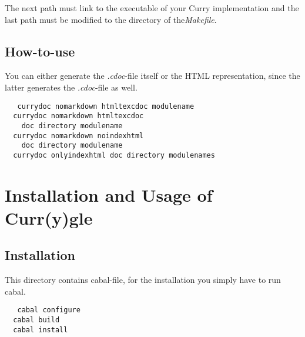 \documentclass[%
	pdftex,%
	a4paper,%
	oneside,%
	chapterprefix,%
	headsepline,%
	12pt%
]{scrbook}
\begin{document}
The next path must link to the executable of your Curry implementation
and the last path must be modified to the directory of
the\emph{Makefile}.

\section{How-to-use}

You can either generate the \emph{.cdoc}-file itself or the HTML
representation, since the latter generates the \emph{.cdoc}-file as well.
 
\begin{tabbing}\tt
~~currydoc~nomarkdown~htmltexcdoc~modulename\\
\tt ~~currydoc~nomarkdown~htmltexcdoc~\\
\tt ~~~~doc~directory~modulename\\
\tt ~~currydoc~nomarkdown~noindexhtml~\\
\tt ~~~~doc~directory~modulename\\
\tt ~~currydoc~onlyindexhtml~doc~directory~modulenames
\end{tabbing}

\chapter{Installation and Usage of Curr(y)gle}\label{a:currysearch}

\section{Installation}

This directory contains cabal-file, for the installation you simply
have to run cabal.

\begin{tabbing}\tt
~~cabal~configure~\\
\tt ~~cabal~build~\\
\tt ~~cabal~install
\end{tabbing}
\end{document}
